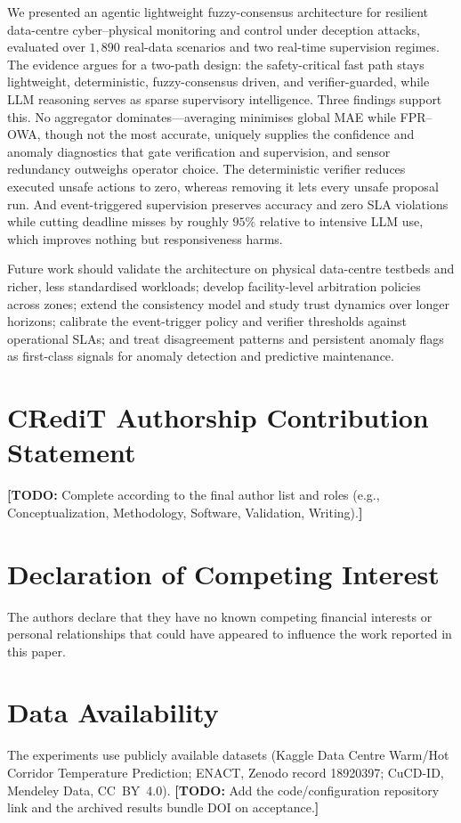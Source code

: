 \documentclass[preprint,11pt]{elsarticle}
\newcommand{\todo}[1]{\textcolor{red!70!black}{\textbf{[TODO:} #1\textbf{]}}}
\begin{document}
We presented an agentic lightweight fuzzy-consensus architecture for
resilient data-centre cyber--physical monitoring and control under
deception attacks, evaluated over $1{,}890$ real-data scenarios and two
real-time supervision regimes. The evidence argues for a two-path design:
the safety-critical fast path stays lightweight, deterministic,
fuzzy-consensus driven, and verifier-guarded, while LLM reasoning serves
as sparse supervisory intelligence. Three findings support this. No
aggregator dominates---averaging minimises global MAE while FPR--OWA,
though not the most accurate, uniquely supplies the confidence and
anomaly diagnostics that gate verification and supervision, and sensor
redundancy outweighs operator choice. The deterministic verifier reduces
executed unsafe actions to zero, whereas removing it lets every unsafe
proposal run. And event-triggered supervision preserves accuracy and
zero SLA violations while cutting deadline misses by roughly $95\%$
relative to intensive LLM use, which improves nothing but responsiveness
harms.

Future work should validate the architecture on physical data-centre
testbeds and richer, less standardised workloads; develop facility-level
arbitration policies across zones; extend the consistency model and study
trust dynamics over longer horizons; calibrate the event-trigger policy
and verifier thresholds against operational SLAs; and treat disagreement
patterns and persistent anomaly flags as first-class signals for
anomaly detection and predictive maintenance.

\section*{CRediT Authorship Contribution Statement}
\todo{Complete according to the final author list and roles (e.g.,
Conceptualization, Methodology, Software, Validation, Writing).}

\section*{Declaration of Competing Interest}
The authors declare that they have no known competing financial
interests or personal relationships that could have appeared to
influence the work reported in this paper.

\section*{Data Availability}
The experiments use publicly available datasets (Kaggle Data Centre
Warm/Hot Corridor Temperature Prediction; ENACT, Zenodo record 18920397;
CuCD-ID, Mendeley Data, CC~BY~4.0). \todo{Add the code/configuration
repository link and the archived results bundle DOI on acceptance.}
\end{document}
